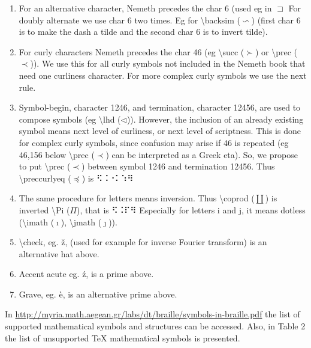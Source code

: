 \documentclass[11.5pt]{sig-alternate} %
\begin{document}
\begin{large}
\begin{enumerate}
    \item For an alternative character, Nemeth precedes the char 6 (used eg in $\sqsupset$ For doubly alternate we use char 6 two times. Eg for \textbackslash{}backsim ($\backsim$) (first char 6 is to make the dash a tilde and the second char 6 is to invert tilde).
    \item For curly characters Nemeth precedes the char 46 (eg \textbackslash{}succ ($\succ$) or \textbackslash{}prec ($\prec$)). We use this for all curly symbols not included in the Nemeth book that need one curliness character. For more complex curly symbols we use the next rule.
    \item Symbol-begin, character 1246, and termination, character 12456, are used to compose symbols (eg \textbackslash{}lhd ($\lhd$)). However, the inclusion of an already existing symbol means next level of curliness, or next level of scriptness. This is done for complex curly symbols, since confusion may arise if 46 is repeated (eg 46,156 below \textbackslash{}prec ($\prec$) can be interpreted as a Greek eta). So, we propose to put \textbackslash{}prec ($\prec$) between symbol 1246 and termination 12456. Thus \textbackslash{}preccurlyeq ($\preccurlyeq$) is  ⠫⠨⠐⠅⠱⠻ 
    \item The same procedure for letters means inversion. Thus \textbackslash{}coprod ($\coprod$) is inverted \textbackslash{}Pi ($\Pi$), that is  ⠫⠨⠏⠻  Especially for letters i and j, it means dotless (\textbackslash{}imath ($\imath$), \textbackslash{}jmath ($\jmath$)).
    \item \textbackslash{}check, eg. ž, (used for example for inverse Fourier transform) is an alternative hat above.
    \item Accent acute eg. ź, is a prime above.
    \item Grave, eg. è, is an alternative prime above.
\end{enumerate}

In \url{http://myria.math.aegean.gr/labs/dt/braille/symbols-in-braille.pdf} the list of supported mathematical symbols and structures can be accessed. Also, in Table 2 the list of unsupported TeX mathematical symbols is presented.


\end{large}
\end{document}
